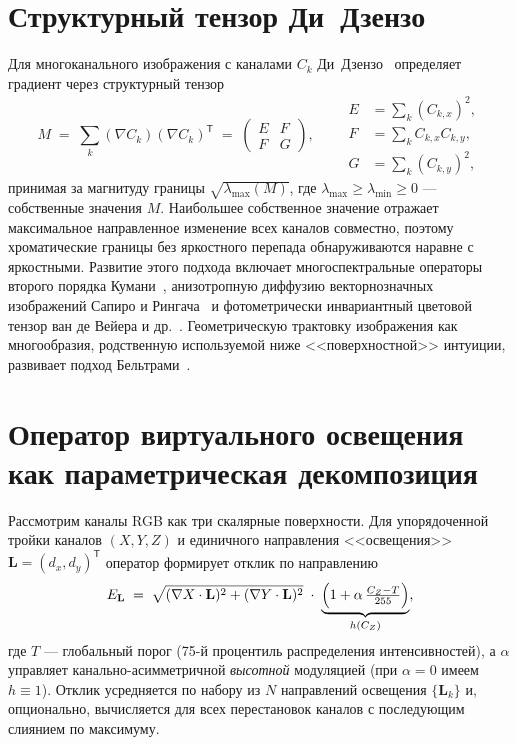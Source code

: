 \documentclass[11pt,a4paper]{article}
\theoremstyle{plain}
\theoremstyle{definition}
\theoremstyle{remark}
\newcommand{\Lvec}{\mathbf{L}}
\newcommand{\grad}{\nabla}
\newcommand{\lmax}{\lambda_{\max}}
\newcommand{\lmin}{\lambda_{\min}}
\newcommand{\T}{^{\mathsf T}}
\begin{document}
\section{Структурный тензор Ди~Дзензо}
\label{sec:background}

Для многоканального изображения с каналами $C_k$ Ди~Дзензо~\cite{dizenzo1986}
определяет градиент через структурный тензор
\begin{equation}
\label{eq:dz-tensor}
M \;=\; \sum_{k} (\grad C_k)(\grad C_k)\T
\;=\;
\begin{pmatrix} E & F \\ F & G \end{pmatrix},
\qquad
\begin{aligned}
E &= \textstyle\sum_k (C_{k,x})^2,\\
F &= \textstyle\sum_k C_{k,x} C_{k,y},\\
G &= \textstyle\sum_k (C_{k,y})^2,
\end{aligned}
\end{equation}
принимая за магнитуду границы $\sqrt{\lmax(M)}$, где
$\lmax \ge \lmin \ge 0$ --- собственные значения $M$. Наибольшее собственное
значение отражает максимальное направленное изменение всех каналов
совместно, поэтому хроматические границы без яркостного перепада
обнаруживаются наравне с яркостными. Развитие этого подхода включает
многоспектральные операторы второго порядка Кумани~\cite{cumani1991},
анизотропную диффузию векторнозначных изображений Сапиро и
Рингача~\cite{sapiro1996} и фотометрически инвариантный цветовой тензор ван
де Вейера и др.~\cite{weijer2006}. Геометрическую трактовку изображения как
многообразия, родственную используемой ниже <<поверхностной>> интуиции,
развивает подход Бельтрами~\cite{sochen1998}.

\section{Оператор виртуального освещения как параметрическая декомпозиция}
\label{sec:decomp}

Рассмотрим каналы RGB как три скалярные поверхности. Для упорядоченной
тройки каналов $(X, Y, Z)$ и единичного направления <<освещения>>
$\Lvec = (d_x, d_y)\T$ оператор формирует отклик по направлению
\begin{equation}
\label{eq:vl-response}
E_{\Lvec}
\;=\;
\sqrt{(\grad X \cdot \Lvec)^2 + (\grad Y \cdot \Lvec)^2}
\;\cdot\;
\underbrace{\Bigl(1 + \alpha\,\tfrac{C_Z - T}{255}\Bigr)}_{h(C_Z)},
\end{equation}
где $T$ --- глобальный порог (75-й процентиль распределения интенсивностей),
а $\alpha$ управляет канально-асимметричной \emph{высотной} модуляцией
(при $\alpha=0$ имеем $h \equiv 1$). Отклик усредняется по набору из $N$
направлений освещения $\{\Lvec_k\}$ и, опционально, вычисляется для всех
перестановок каналов с последующим слиянием по максимуму.
\end{document}
